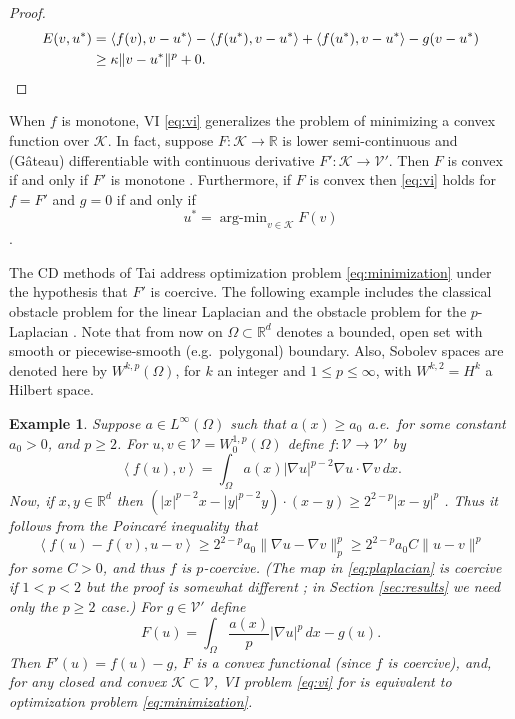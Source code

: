 \documentclass[letterpaper,final,12pt,reqno]{amsart}
\theoremstyle{cstyle}
\theoremstyle{cstyle*}
\theoremstyle{dstyle}
\newtheorem{example}[theorem]{Example}
\numberwithin{equation}{section}
\numberwithin{figure}{section}
\numberwithin{table}{section}
\numberwithin{theorem}{section}
\newcommand{\RR}{\mathbb{R}}
\newcommand{\grad}{\nabla}
\newcommand{\cK}{\mathcal{K}}
\newcommand{\cV}{\mathcal{V}}
\newcommand{\ip}[2]{\left<#1,#2\right>}
\begin{document}
\begin{proof}
\begin{align*}
E(v,u^*) &= \ip{f(v)}{v-u^*} - \ip{f(u^*)}{v-u^*} + \ip{f(u^*)}{v-u^*} - g(v-u^*) \\
   &\ge \kappa \|v-u^*\|^p + 0.  \qedhere
\end{align*}
\end{proof}

When $f$ is monotone, VI \eqref{eq:vi} generalizes the problem of minimizing a convex function over $\cK$.  In fact, suppose $F:\cK \to \RR$ is lower semi-continuous and (G\^ateau) differentiable with continuous derivative $F':\cK \to \cV'$.  Then $F$ is convex if and only if $F'$ is monotone \cite[Proposition I.5.5]{EkelandTemam1976}.  Furthermore, if $F$ is convex then \eqref{eq:vi} holds for $f=F'$ and $g=0$ if and only if
\begin{equation}
u^* = \operatorname{arg-min}_{v\in\cK} F(v) \label{eq:minimization}
\end{equation}
\cite[Proposition II.2.1]{EkelandTemam1976}.

The CD methods of Tai \cite{Tai2003} address optimization problem \eqref{eq:minimization} under the hypothesis that $F'$ is coercive.  The following example includes the classical obstacle problem for the linear Laplacian \cite{GraeserKornhuber2009} and the obstacle problem for the $p$-Laplacian \cite{ChoeLewis1991}.  Note that from now on $\Omega \subset \RR^d$ denotes a bounded, open set with smooth or piecewise-smooth (e.g.~polygonal) boundary.  Also, Sobolev spaces \cite{Evans2010} are denoted here by $W^{k,p}(\Omega)$, for $k$ an integer and $1\le p \le \infty$, with $W^{k,2}=H^k$ a Hilbert space.

\begin{example}  \label{ex:plaplacian}  Suppose $a\in L^\infty(\Omega)$ such that $a(x)\ge a_0$ a.e.~for some constant $a_0>0$, and $p\ge 2$.  For $u,v \in \cV = W^{1,p}_0(\Omega)$ define $f:\cV \to \cV'$ by
\begin{equation}
\ip{f(u)}{v} = \int_\Omega a(x) |\grad u|^{p-2} \grad u \cdot \grad v\,dx. \label{eq:plaplacian}
\end{equation}
Now, if $x,y\in\RR^d$ then $(|x|^{p-2} x - |y|^{p-2} y)\cdot (x-y) \ge 2^{2-p} |x-y|^p$ \cite[see Appendix A and references therein]{Bueler2021conservation}.  Thus it follows from the Poincar\'e inequality that
    $$\ip{f(u) - f(v)}{u-v} \ge 2^{2-p} a_0 \|\grad u - \grad v\|_p^p \ge 2^{2-p} a_0 C \|u-v\|^p$$
for some $C>0$, and thus $f$ is $p$-coercive.  (The map in \eqref{eq:plaplacian} is coercive if $1<p<2$ but the proof is somewhat different \cite[Theorem 4.4]{Bueler2021conservation}; in Section \ref{sec:results} we need only the $p\ge 2$ case.)  For $g\in\cV'$ define
    $$F(u) = \int_\Omega \frac{a(x)}{p} |\grad u|^p\,dx - g(u).$$
Then $F'(u) = f(u) - g$, $F$ is a convex functional (since $f$ is coercive), and, for any closed and convex $\cK\subset \cV$, VI problem \eqref{eq:vi} for is equivalent to optimization problem \eqref{eq:minimization}.
\end{example}
\end{document}
